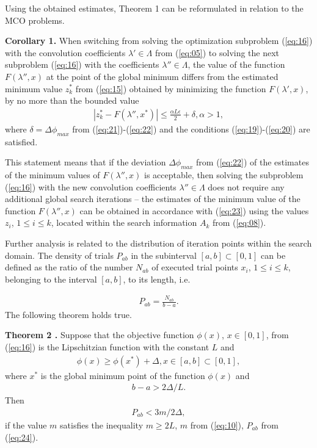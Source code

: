 \documentclass[smallcondensed]{svjour3}     %
\begin{document}
Using the obtained estimates, Theorem 1 can be reformulated in relation to the MCO problems.\par

{\bf Corollary 1.} When switching from solving the optimization subproblem (\ref{eq:16}) with the convolution coefficients $\lambda' \in \Lambda$ from (\ref{eq:05}) to solving the next subproblem (\ref{eq:16}) with the coefficients $\lambda'' \in \Lambda$, the value of the function $F(\lambda'',x)$ at the point of the global minimum differs from the estimated minimum value $z_k^*$ from (\ref{eq:15}) obtained by minimizing the function $F(\lambda',x)$, by no more than the bounded value 
\begin{eqnarray} \label{eq:23}
|z_k^*-F(\lambda'',x^*)| \leq \frac{\alpha L \epsilon}{2} + \delta, \alpha>1, 
\end{eqnarray}
where $\delta=\Delta \phi_{max}$ from (\ref{eq:21})-(\ref{eq:22}) and the conditions (\ref{eq:19})-(\ref{eq:20}) are satisfied.\par

This statement means that if the deviation $\Delta \phi_{max}$ from (\ref{eq:22}) of the estimates of the minimum values of $F(\lambda'',x)$ is acceptable, then solving the subproblem (\ref{eq:16}) with the new convolution coefficients $\lambda'' \in \Lambda$ does not require any additional global search iterations -- the estimates of the minimum value of the function $F(\lambda'',x)$ can be obtained in accordance with (\ref{eq:23}) using the values $z_i$, $1 \leq i \leq k$, located within the search information $A_k$ from (\ref{eq:08}).\par

Further analysis is related to the distribution of iteration points within the search domain. The density of trials $P_{ab}$ in the subinterval $[a,b] \subset [0,1]$ can be defined as the ratio of the number $N_{ab}$ of executed trial points $x_i$, $1 \leq i \leq k$, belonging to the interval $[a,b]$, to its length, i.e.

\begin{eqnarray} \label{eq:24}
P_{ab} = \frac{N_{ab}}{b-a}.
\end{eqnarray}
The following theorem holds true.\par

{\bf Theorem 2 \cite{c37,c38}.} Suppose that the objective function $\phi(x)$, $x \in [0,1]$, from (\ref{eq:16}) is the Lipschitzian function with the constant $L$ and 
\begin{eqnarray} \label{eq:25}
\phi (x) \geq \phi(x^*)+\Delta, x \in [a,b] \subset [0,1],
\end{eqnarray}
where $x^*$ is the global minimum point of the function $\phi(x)$ and
\begin{eqnarray*}
b - a > 2 \Delta / L.
\end{eqnarray*}
Then
\begin{eqnarray*}
P_{ab} < 3 m /2 \Delta,
\end{eqnarray*}
if the value $m$ satisfies the inequality $m \geq 2L$, $m$ from (\ref{eq:10}), $P_{ab}$ from (\ref{eq:24}).\par
\end{document}
